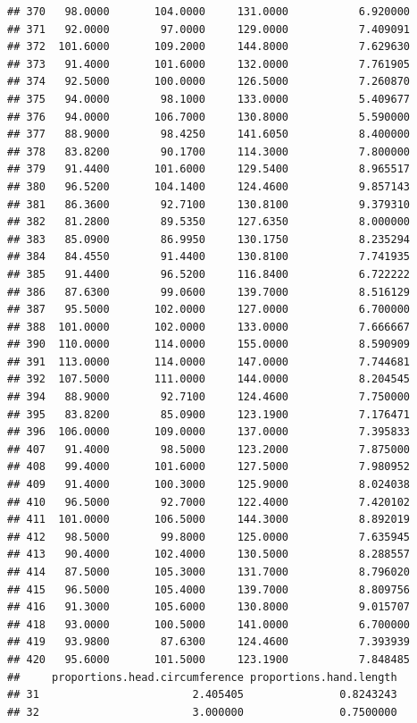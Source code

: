 \documentclass[]{article}
\begin{document}
\begin{verbatim}
## 370   98.0000       104.0000     131.0000           6.920000
## 371   92.0000        97.0000     129.0000           7.409091
## 372  101.6000       109.2000     144.8000           7.629630
## 373   91.4000       101.6000     132.0000           7.761905
## 374   92.5000       100.0000     126.5000           7.260870
## 375   94.0000        98.1000     133.0000           5.409677
## 376   94.0000       106.7000     130.8000           5.590000
## 377   88.9000        98.4250     141.6050           8.400000
## 378   83.8200        90.1700     114.3000           7.800000
## 379   91.4400       101.6000     129.5400           8.965517
## 380   96.5200       104.1400     124.4600           9.857143
## 381   86.3600        92.7100     130.8100           9.379310
## 382   81.2800        89.5350     127.6350           8.000000
## 383   85.0900        86.9950     130.1750           8.235294
## 384   84.4550        91.4400     130.8100           7.741935
## 385   91.4400        96.5200     116.8400           6.722222
## 386   87.6300        99.0600     139.7000           8.516129
## 387   95.5000       102.0000     127.0000           6.700000
## 388  101.0000       102.0000     133.0000           7.666667
## 390  110.0000       114.0000     155.0000           8.590909
## 391  113.0000       114.0000     147.0000           7.744681
## 392  107.5000       111.0000     144.0000           8.204545
## 394   88.9000        92.7100     124.4600           7.750000
## 395   83.8200        85.0900     123.1900           7.176471
## 396  106.0000       109.0000     137.0000           7.395833
## 407   91.4000        98.5000     123.2000           7.875000
## 408   99.4000       101.6000     127.5000           7.980952
## 409   91.4000       100.3000     125.9000           8.024038
## 410   96.5000        92.7000     122.4000           7.420102
## 411  101.0000       106.5000     144.3000           8.892019
## 412   98.5000        99.8000     125.0000           7.635945
## 413   90.4000       102.4000     130.5000           8.288557
## 414   87.5000       105.3000     131.7000           8.796020
## 415   96.5000       105.4000     139.7000           8.809756
## 416   91.3000       105.6000     130.8000           9.015707
## 418   93.0000       100.5000     141.0000           6.700000
## 419   93.9800        87.6300     124.4600           7.393939
## 420   95.6000       101.5000     123.1900           7.848485
##     proportions.head.circumference proportions.hand.length
## 31                        2.405405               0.8243243
## 32                        3.000000               0.7500000

\end{verbatim}
\end{document}
